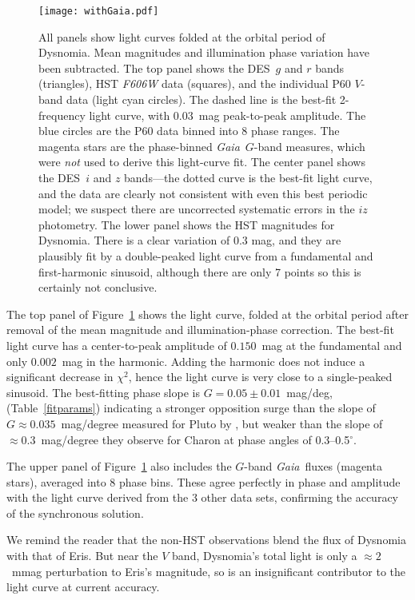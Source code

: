 \documentclass[onecolumn]{aastex631}
\newcommand{\des}{DES}
\newcommand{\gaia}{\textit{Gaia}}
\begin{document}
\begin{figure}
  \begin{center}
    \texttt{[image: withGaia.pdf]}
  \end{center}
  \caption{All panels show light curves folded at the orbital period of Dysnomia. Mean magnitudes and illumination phase variation have been subtracted.  The top panel shows the \des\ $g$ and $r$ bands (triangles), HST {\it F606W} data (squares), and the individual P60 $V$-band data (light cyan circles). The dashed line is the best-fit 2-frequency light curve, with 0.03~mag peak-to-peak amplitude. The blue circles are the P60 data binned into 8 phase ranges. The magenta stars are the phase-binned \gaia\ $G$-band measures, which were \emph{not} used to derive this light-curve fit. The center panel shows the \des\ $i$ and $z$ bands---the dotted curve is the best-fit light curve, and the data are clearly not consistent with even this best periodic model; we suspect there are uncorrected systematic errors in the $iz$ photometry. The lower panel shows the HST magnitudes for Dysnomia. There is a clear variation of 0.3 mag, and they are plausibly fit by a double-peaked light curve from a fundamental and first-harmonic sinusoid, although there are only 7 points so this is certainly not conclusive.}
  \label{phased}
\end{figure}

The top panel of Figure~\ref{phased} shows the light curve, folded at the orbital period after removal of the mean magnitude and illumination-phase correction. The best-fit light curve has a center-to-peak amplitude of $0.150$~mag at the fundamental and only $0.002$~mag in the harmonic. Adding the harmonic does not induce a significant decrease in $\chi^2$, hence the light curve is very close to a single-peaked sinusoid. The best-fitting phase slope is $G=0.05\pm0.01$~mag/deg, (Table~\ref{fitparams}) indicating a stronger opposition surge than the slope of $G\approx0.035$~mag/degree measured for Pluto by \citet{Buie2010}, but weaker than the slope of $\approx 0.3$~mag/degree they observe for Charon at phase angles of 0.3--0.5$^{\circ}$.

The upper panel of Figure~\ref{phased} also includes the $G$-band \gaia\ fluxes (magenta stars), averaged into 8 phase bins. These agree perfectly in phase and amplitude with the light curve derived from the 3 other data sets, confirming the accuracy of the synchronous solution.

We remind the reader that the non-HST observations blend the flux of Dysnomia with that of Eris.  But near the $V$ band, Dysnomia's total light is only a $\approx2$~mmag perturbation to Eris's magnitude, so is an insignificant contributor to the light curve at current accuracy.
\end{document}
